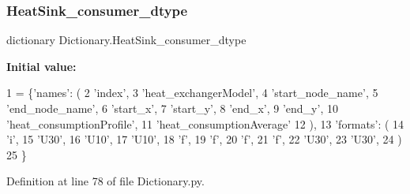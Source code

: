 \subsubsection{\texorpdfstring{Heat\+Sink\+\_\+consumer\+\_\+dtype}{HeatSink\_consumer\_dtype}}
{\footnotesize\ttfamily dictionary Dictionary.\+Heat\+Sink\+\_\+consumer\+\_\+dtype}

{\bfseries Initial value\+:}
\begin{DoxyCode}
1 = \{\textcolor{stringliteral}{'names'}: (
2                                 \textcolor{stringliteral}{'index'},
3                                 \textcolor{stringliteral}{'heat\_exchangerModel'},
4                                 \textcolor{stringliteral}{'start\_node\_name'},
5                                 \textcolor{stringliteral}{'end\_node\_name'},
6                                 \textcolor{stringliteral}{'start\_x'},
7                                 \textcolor{stringliteral}{'start\_y'},
8                                 \textcolor{stringliteral}{'end\_x'},
9                                 \textcolor{stringliteral}{'end\_y'},
10                                 \textcolor{stringliteral}{'heat\_consumptionProfile'},
11                                 \textcolor{stringliteral}{'heat\_consumptionAverage'}
12                                 ),
13                        \textcolor{stringliteral}{'formats'}: (
14                                 \textcolor{stringliteral}{'i'},
15                                 \textcolor{stringliteral}{'U30'},
16                                 \textcolor{stringliteral}{'U10'},
17                                 \textcolor{stringliteral}{'U10'},
18                                 \textcolor{stringliteral}{'f'},
19                                 \textcolor{stringliteral}{'f'},
20                                 \textcolor{stringliteral}{'f'},
21                                 \textcolor{stringliteral}{'f'},
22                                 \textcolor{stringliteral}{'U30'},
23                                 \textcolor{stringliteral}{'U30'},
24                                 )
25                                \}
\end{DoxyCode}


Definition at line 78 of file Dictionary.\+py.

\mbox{\label{namespace_dictionary_a334d744a07f946e317946dbd8b5785bf}} 
